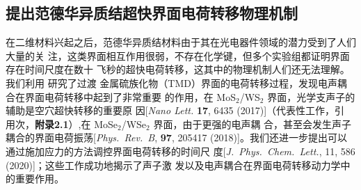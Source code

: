 \subsection{提出范德华异质结超快界面电荷转移物理机制}




在二维材料兴起之后，范德华异质结材料由于其在光电器件领域的潜力受到了人们大量的关
注，这类界面相互作用很弱，不存在化学键，但多个实验组都证明界面存在时间尺度在数十
飞秒的超快电荷转移，这其中的物理机制人们还无法理解。我们利用 \hnamd{} 研究了过渡
金属硫族化物（TMD）界面的电荷转移过程，发现电声耦合在界面电荷转移中起到了非常重要
的作用，在 MoS$_2$/WS$_2$ 界面，光学支声子的辅助是空穴超快转移的重要原
因[\textit{Nano Lett.} \textbf{17}, 6435 (2017)]（代表性工作，引
用次，\textbf{附录2.1}）,在 MoSe$_2$/WSe$_2$ 界面，由于更强的电声耦
合，甚至会发生声子耦合的界面电荷振荡[\textit{Phys.\ Rev.\ B}, \textbf{97},
205417 (2018)]。我们还进一步提出可以通过施加应力的方法调控界面电荷转移的时间尺
度[\textit{J.\ Phys.\ Chem.\ Lett.}, 11, 586 (2020)]；这些工作成功地揭示了声子激
发以及电声耦合在界面电荷转移动力学中的重要作用。

